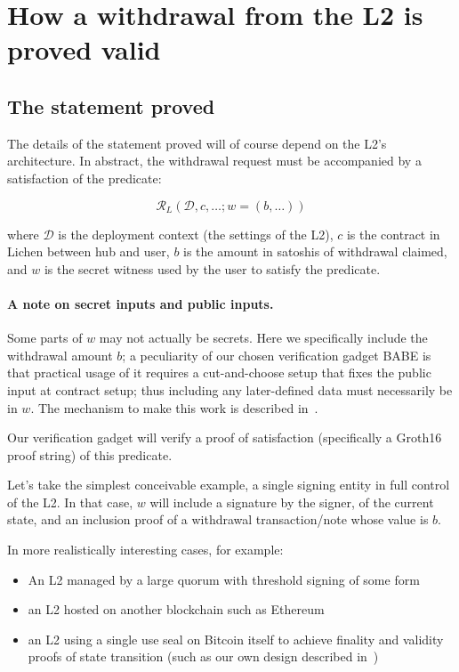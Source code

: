 \documentclass[11pt]{article}
\begin{document}
\section{How a withdrawal from the L2 is proved valid}
\label{sec:statement}

\subsection{The statement proved}

The details of the statement proved will of course depend on the L2's architecture. In abstract, the withdrawal request must be accompanied by a satisfaction of the predicate:

\[\mathcal{R}_L(\mathcal{D}, c, \ldots ; w=(b, \ldots))\]

where $\mathcal{D}$ is the deployment context (the settings of the L2), $c$ is the contract in Lichen between hub and user, $b$ is the amount in satoshis of withdrawal claimed, and $w$ is the secret witness used by the user to satisfy the predicate.

\paragraph{A note on secret inputs and public inputs.} Some parts of $w$ may not actually be secrets. Here we specifically include the withdrawal amount $b$; a peculiarity of our chosen verification gadget BABE is that practical usage of it requires a cut-and-choose setup that fixes the public input at contract setup; thus including any later-defined data must necessarily be in $w$. The mechanism to make this work is described in~\cite[\S 5]{lichenbuilt}.


Our verification gadget will verify a proof of satisfaction (specifically a Groth16 proof string) of this predicate.

 Let's take the simplest conceivable example, a single signing entity in full control of the L2. In that case, $w$ will include a signature by the signer, of the current state, and an inclusion proof of a withdrawal transaction/note whose value is $b$.
 
In more realistically interesting cases, for example:

\begin{itemize}
\item An L2 managed by a large quorum with threshold signing of some form
\item an L2 hosted on another blockchain such as Ethereum
\item an L2 using a single use seal on Bitcoin itself to achieve finality and validity proofs of state transition (such as our own design described in~\cite{lichenbuilt})
\end{itemize}
\end{document}
